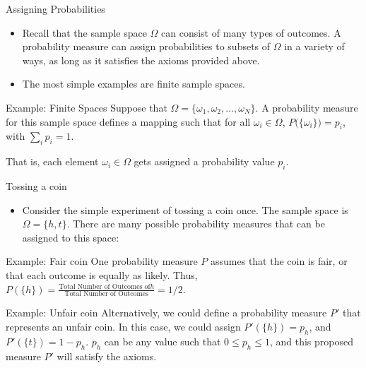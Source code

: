 \begin{frame}[allowframebreaks]{Assigning Probabilities}
  \begin{itemize}
    \item Recall that the sample space $\Omega$ can consist of many types of outcomes. A probability measure can assign probabilities to subsets of $\Omega$ in a variety of ways, as long as it satisfies the axioms provided above.
    \item The most simple examples are finite sample spaces.
  \end{itemize}
  
  \begin{exampleblock}{Example: Finite Spaces}
  Suppose that $\Omega = \{\omega_1, \omega_2, \ldots, \omega_N\}$.
  A probability measure for this sample space defines a mapping such that for all $\omega_i \in \Omega$, $P\big(\{\omega_i\}\big) = p_i$, with $\sum_i p_i = 1$.
  
  That is, each element $\omega_i \in \Omega$ gets assigned a probability value $p_i$.
  \end{exampleblock}
  
\end{frame}

\begin{frame}[allowframebreaks]{Tossing a coin}
  \begin{itemize}
    \item Consider the simple experiment of tossing a coin once. The sample space is $\Omega = \{h, t\}$. There are many possible probability measures that can be assigned to this space:
  \end{itemize}
  
  \begin{exampleblock}{Example: Fair coin}
    One probability measure $P$ assumes that the coin is fair, or that each outcome is equally as likely.
    Thus, $P(\{h\}) = \frac{\text{Total Number of Outcomes of} h}{\text{Total Number of Outcomes}} = 1/2$.
  \end{exampleblock}
  
  \begin{exampleblock}{Example: Unfair coin}
    Alternatively, we could define a probability measure $P'$ that represents an unfair coin. In this case, we could assign $P'(\{h\}) = p_h$, and $P'(\{t\}) = 1 - p_h$. $p_h$ can be any value such that $0 \leq p_h \leq 1$, and this proposed measure $P'$ will satisfy the axioms.
  \end{exampleblock}
\end{frame}


